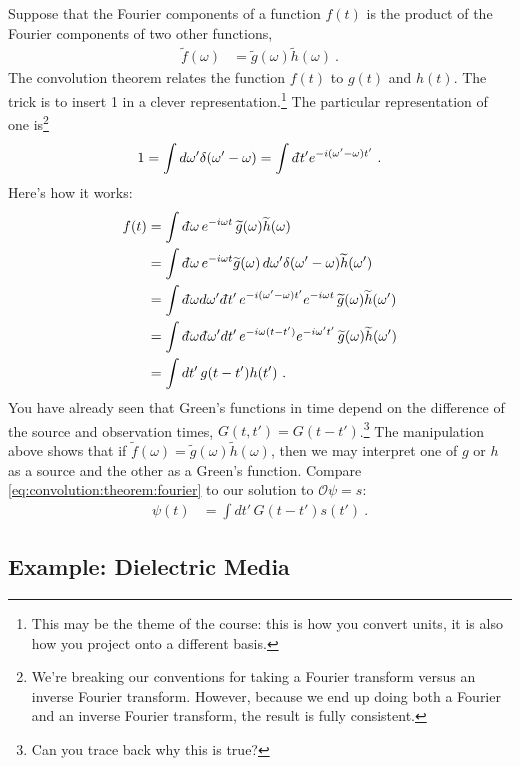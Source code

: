 Suppose that the Fourier components of a function $f(t)$ is the product of the Fourier components of two other functions,
\begin{align}
	\tilde f(\omega) &= \tilde g(\omega) \tilde h(\omega) \ .
\end{align}
The convolution theorem relates the function $f(t)$ to $g(t)$ and $h(t)$. The trick is to insert 1 in a clever representation.\footnote{This may be the theme of the course: this is how you convert units, it is also how you project onto a different basis.} The particular representation of one is\footnote{We're breaking our conventions for taking a Fourier transform versus an inverse Fourier transform. However, because we end up doing both a Fourier and an inverse Fourier transform, the result is fully consistent.} 
\begin{align}
	1
	=\int d\omega' \delta(\omega'-\omega) 
	= \int \dbar t' e^{-i(\omega'-\omega)t'} \ .
\end{align}
Here's how it works:
\begin{align}
	f(t) &= \int \dbar \omega \, e^{-i\omega t}\, \tilde g(\omega) \tilde h(\omega)
	\\ 
	&= \int \dbar \omega  \, e^{-i\omega t} \tilde g(\omega)\, d\omega' \delta(\omega'-\omega) \tilde h(\omega')
	\\ 
	&= \int \dbar \omega d\omega' \dbar t'  \, e^{-i(\omega'-\omega)t'}e^{-i\omega t}\,  \tilde g(\omega)\tilde h(\omega')
	\\ 
	&= \int \dbar \omega  \dbar\omega' d t'  \, e^{-i\omega(t-t')}e^{-i\omega' t'}\,  \tilde g(\omega)\tilde h(\omega')
	\\ 
	&= \int dt'  \, g(t-t') h(t') \ .
	\label{eq:convolution:theorem:fourier}
\end{align}
You have already seen that Green's functions in time depend on the difference of the source and observation times, $G(t,t') = G(t-t')$.\footnote{Can you trace back why this is true?} The manipulation above shows that if $\tilde f(\omega) = \tilde g(\omega)\tilde h(\omega)$, then we may interpret one of $g$ or $h$ as a source and the other as a Green's function. Compare \eqref{eq:convolution:theorem:fourier} to our solution to $\mathcal O\psi = s$:
\begin{align}
	\psi(t) &= \int dt' \, G(t-t') s(t') \ .
\end{align}



\subsection{Example: Dielectric Media}

